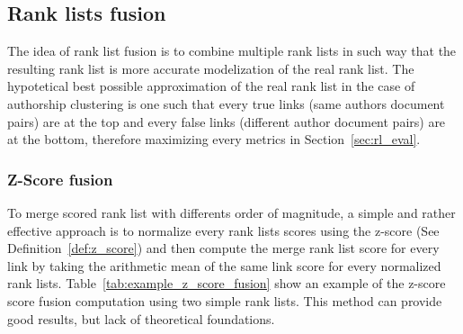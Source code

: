 \subsection{Rank lists fusion}
\label{sec:rank_lists_fusion}

The idea of rank list fusion is to combine multiple rank lists in such way that the resulting rank list is more accurate modelization of the real rank list.
The hypotetical best possible approximation of the real rank list in the case of authorship clustering is one such that  every true links (same authors document pairs) are at the top and every false links (different author document pairs) are at the bottom, therefore maximizing every metrics in Section~\ref{sec:rl_eval}.

\subsubsection{Z-Score fusion}

To merge scored rank list with differents order of magnitude, a simple and rather effective approach is to normalize every rank lists scores using the z-score (See Definition~\ref{def:z_score}) and then compute the merge rank list score for every link by taking the arithmetic mean of the same link score for every normalized rank lists.
Table~\ref{tab:example_z_score_fusion} show an example of the z-score score fusion computation using two simple rank lists.
This method can provide good results, but lack of theoretical foundations.

